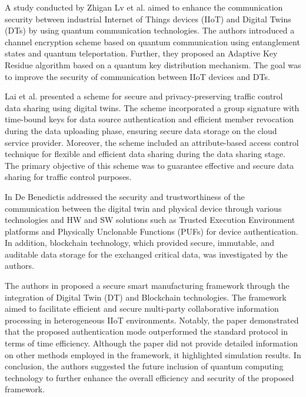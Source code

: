 A study conducted by Zhigan Lv et al. \cite{lvDigitalTwinsBased2022} aimed to enhance the communication security between industrial Internet of Things devices (IIoT) and Digital Twins (DTs) by using quantum communication technologies. The authors introduced a channel encryption scheme based on quantum communication using entanglement states and quantum teleportation. Further, they proposed an Adaptive Key Residue algorithm based on a quantum key distribution mechanism. The goal was to improve the security of communication between IIoT devices and DTs.


Lai et al. \cite{chengzhelaiSPDTSecurePrivacyPreserving2022} presented a scheme for secure and privacy-preserving traffic control data sharing using digital twins. The scheme incorporated a group signature with time-bound keys for data source authentication and efficient member revocation during the data uploading phase, ensuring secure data storage on the cloud service provider. Moreover, the scheme included an attribute-based access control technique for flexible and efficient data sharing during the data sharing stage. The primary objective of this scheme was to guarantee effective and secure data sharing for traffic control purposes.

In \cite{debenedictisAdoptionSecureCyber2022} De Benedictis addressed the security and trustworthiness of the communication between the digital twin and physical device through various technologies and HW and SW solutions such as Trusted Execution Environment platforms and Physically Unclonable Functions (PUFs) for device authentication. In addition, blockchain technology, which provided secure, immutable, and auditable data storage for the exchanged critical data, was investigated by the authors.


The authors in \cite{chenDigitalTwinBasedHeuristic2023a} proposed a secure smart manufacturing framework through the integration of Digital Twin (DT) and Blockchain technologies. The framework aimed to facilitate efficient and secure multi-party collaborative information processing in heterogeneous IIoT environments. Notably, the paper demonstrated that the proposed authentication mode outperformed the standard protocol in terms of time efficiency. Although the paper did not provide detailed information on other methods employed in the framework, it highlighted simulation results. In conclusion, the authors suggested the future inclusion of quantum computing technology to further enhance the overall efficiency and security of the proposed framework.


